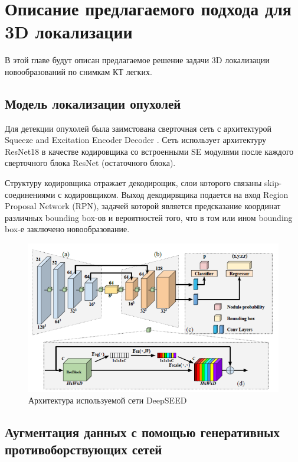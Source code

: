 \chapter{Описание предлагаемого подхода для 3D локализации}

В этой главе будут описан предлагаемое решение задачи 3D локализации новообразований по снимкам КТ легких.

\section{Модель локализации опухолей}

Для детекции опухолей была заимстована сверточная сеть с архитектурой Squeeze and Excitation Encoder Decoder \cite{deep-seed}. Сеть использует архитектуру ResNet18 в качестве кодировщика со встроенными SE модулями после каждого сверточного блока ResNet (остаточного блока). 

Структуру кодировщика отражает декодирощик, слои которого связаны skip-соединениями с кодировщиком. Выход декодирвщика подается на вход Region Proposal Network (RPN), задачей которой является предсказание координат различных bounding box-ов и вероятностей того, что в том или ином bounding box-е заключено новообразование.

\begin{figure}[!h]
\includegraphics[width=\linewidth]{deep-seed-architecture.png}
\caption{Архитектура используемой сети DeepSEED}\label{deep-seed-architecture}
\centering
\end{figure}


\section{Аугментация данных с помощью генеративных противоборствующих сетей}


